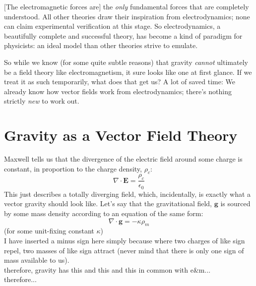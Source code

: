 \documentclass[11pt]{article}
\begin{document}
\begin{displayquote}
$[$The electromagnetic forces are$]$ the \emph{only} fundamental forces that are completely understood.  All other theories draw their inspiration from electrodynamics; none can claim experimental verification at this stage.  So electrodynamics, a beautifully complete and successful theory, has become a kind of paradigm for physicists: an ideal model than other theories strive to emulate.
\end{displayquote}

So while we know (for some quite subtle reasons) that gravity \emph{cannot} ultimately be a field theory like electromagnetism, it sure looks like one at first glance.  If we treat it as such temporarily, what does that get us?  A lot of saved time:  We already know how vector fields work from electrodynamics; there's nothing strictly \emph{new} to work out.

\section{Gravity as a Vector Field Theory}
Maxwell tells us that the divergence of the electric field around some charge is constant, in proportion to the charge density, $\rho_c$:
\begin{equation}
\nabla \cdot \mathbf{E} = \frac{\rho_c}{\epsilon_0}
\end{equation}
This just describes a totally diverging field, which, incidentally, is exactly what a vector gravity should look like.  Let's say that the gravitational field, $\mathbf{g}$ is sourced by some mass density according to an equation of the same form:
\begin{equation}
\nabla \cdot \mathbf{g} = -\kappa \rho_m
\end{equation}
(for some unit-fixing constant $\kappa$)\\
I have inserted a minus sign here simply because where two charges of like sign repel, two masses of like sign attract (never mind that there is only one sign of mass available to us).\\
therefore, gravity has this and this and this in common with e\&m...\\
therefore...\\
\begin{center}
\end{center}
\end{document}
